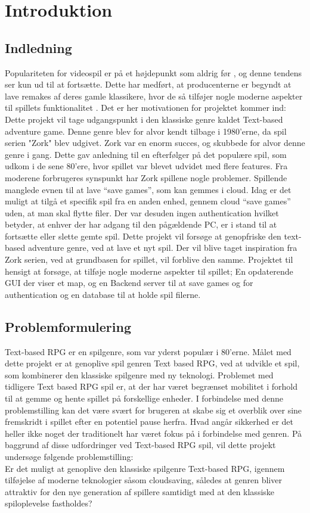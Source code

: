 \section{Introduktion}
\subsection{Indledning}

Populariteten for videospil er på et højdepunkt som aldrig før \cite{WE-PC}, og denne tendens ser kun ud til at fortsætte. Dette har medført, at producenterne er begyndt at lave remakes af deres gamle klassikere, hvor de så tilføjer nogle moderne aspekter til spillets funktionalitet \cite{Protocol}. Det er her motivationen for projektet kommer ind: \\

Dette projekt vil tage udgangspunkt i den klassiske genre kaldet Text-based adventure game. Denne genre blev for alvor kendt tilbage i 1980'erne, da spil serien "Zork" blev udgivet. Zork var en enorm succes\cite{WikiZork}, og skubbede for alvor denne genre i gang. 
Dette gav anledning til en efterfølger på det populære spil, som udkom i de sene 80’ere, hvor spillet var blevet udvidet med flere features.
Fra moderene forbrugeres synspunkt har Zork spillene nogle problemer. Spillende manglede evnen til at lave ``save games'', som kan gemmes i cloud. 
Idag er det muligt at tilgå et specifik spil fra en anden enhed, gennem cloud ``save games'' uden, at man skal flytte filer. Der var desuden ingen 
authentication hvilket betyder, at enhver der har adgang til den pågældende PC, er i stand til at fortsætte eller slette gemte spil. 
Dette projekt vil forsøge at genopfriske den text-based adventure genre, ved at lave et nyt spil. Der vil blive taget inspiration 
fra Zork serien, ved at grundbasen for spillet, vil forblive den samme. Projektet til hensigt at forsøge, at tilføje nogle moderne aspekter til spillet;
En opdaterende GUI der viser et map, og en Backend server til at save games og for authentication og en database til at holde spil filerne.

\subsection{Problemformulering}
Text-based RPG er en spilgenre, som var yderst populær i 80’erne. Målet med dette projekt er at genoplive spil genren Text based RPG, ved at udvikle et spil, 
som kombinerer den klassiske spilgenre med ny teknologi. Problemet med tidligere Text based RPG spil er, at der har været begrænset mobilitet i forhold 
til at gemme og hente spillet på forskellige enheder. I forbindelse med denne problemstilling kan det være svært for brugeren at skabe sig et overblik over
sine fremskridt i spillet efter en potentiel pause herfra. Hvad angår sikkerhed er det heller ikke noget der traditionelt har været fokus på i forbindelse med genren. 
På baggrund af disse udfordringer ved Text-based RPG spil, vil dette projekt undersøge følgende problemstilling: \\

Er det muligt at genoplive den klassiske spilgenre Text-based RPG, igennem tilføjelse af moderne teknologier såsom cloudsaving, således at genren bliver attraktiv
for den nye generation af spillere samtidigt med at den klassiske spiloplevelse fastholdes?
